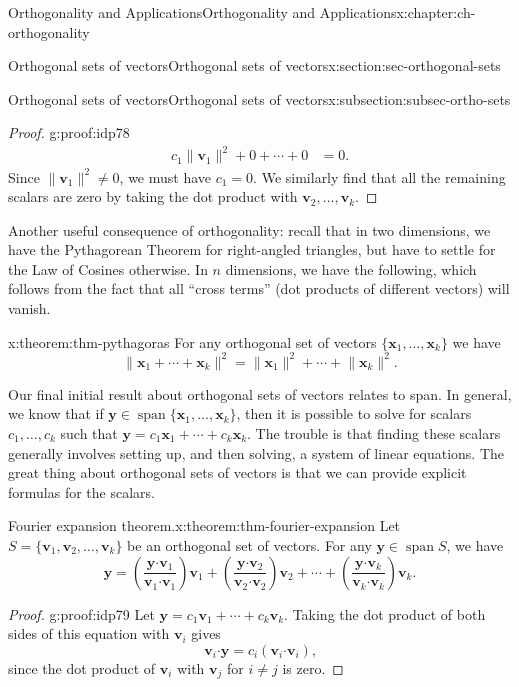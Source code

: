 \documentclass[oneside,10pt,]{book}
\numberwithin{equation}{section}
\newcommand{\spn}{\operatorname{span}}
\newcommand{\dotp}{\!\boldsymbol{\cdot}\!}
\newcommand{\len}[1]{\lVert #1\rVert}
\newcommand{\vv}{\mathbf{v}}
\newcommand{\xx}{\mathbf{x}}
\newcommand{\yy}{\mathbf{y}}
\newcommand{\amp}{&}
\begin{document}
\begin{chapterptx}{Orthogonality and Applications}{}{Orthogonality and Applications}{}{}{x:chapter:ch-orthogonality}
\begin{sectionptx}{Orthogonal sets of vectors}{}{Orthogonal sets of vectors}{}{}{x:section:sec-orthogonal-sets}
\begin{subsectionptx}{Orthogonal sets of vectors}{}{Orthogonal sets of vectors}{}{}{x:subsection:subsec-ortho-sets}
\begin{proof}{}{g:proof:idp78}
\begin{align*}
c_1\len{\vv_1}^2+0+\cdots + 0\amp = 0 \text{.}
\end{align*}
Since \(\len{\vv_1}^2\neq 0\), we must have \(c_1=0\). We similarly find that all the remaining scalars are zero by taking the dot product with \(\vv_2,\ldots, \vv_k\).%
\end{proof}
Another useful consequence of orthogonality: recall that in two dimensions, we have the Pythagorean Theorem for right-angled triangles, but have to settle for the Law of Cosines otherwise. In \(n\) dimensions, we have the following, which follows from the fact that all ``cross terms'' (dot products of different vectors) will vanish.%
\begin{theorem}{}{}{x:theorem:thm-pythagoras}%
For any orthogonal set of vectors \(\{\xx_1,\ldots, \xx_k\}\) we have%
\begin{equation*}
\len{\xx_1+\cdots +\xx_k}^2 = \len{\xx_1}^2+\cdots + \len{\xx_k}^2\text{.}
\end{equation*}
%
\end{theorem}
Our final initial result about orthogonal sets of vectors relates to span. In general, we know that if \(\yy\in\spn\{\xx_1,\ldots, \xx_k\}\), then it is possible to solve for scalars \(c_1,\ldots, c_k\) such that \(\yy=c_1\xx_1+\cdots+ c_k\xx_k\). The trouble is that finding these scalars generally involves setting up, and then solving, a system of linear equations. The great thing about orthogonal sets of vectors is that we can provide explicit formulas for the scalars.%
\begin{theorem}{Fourier expansion theorem.}{}{x:theorem:thm-fourier-expansion}%
Let \(S=\{\vv_1,\vv_2,\ldots, \vv_k\}\) be an orthogonal set of vectors. For any \(\yy\in \spn S\), we have%
\begin{equation*}
\yy = \left(\frac{\yy\dotp\mathbf{v}_1}{\vv_1\dotp\vv_1}\right)\vv_1+
\left(\frac{\yy\dotp\mathbf{v}_2}{\vv_2\dotp\vv_2}\right)\vv_2+\cdots +
\left(\frac{\yy\dotp\mathbf{v}_k}{\vv_k\dotp\vv_k}\right)\vv_k\text{.}
\end{equation*}
%
\end{theorem}
\begin{proof}{}{g:proof:idp79}
Let \(\yy=c_1\vv_1+\cdots + c_k\vv_k\). Taking the dot product of both sides of this equation with \(\vv_i\) gives%
\begin{equation*}
\vv_i\dotp\yy = c_i(\vv_i\dotp\vv_i)\text{,}
\end{equation*}
since the dot product of \(\vv_i\) with \(\vv_j\) for \(i\neq j\) is zero.%
\end{proof}

\end{subsectionptx}
\end{sectionptx}
\end{chapterptx}
\end{document}
